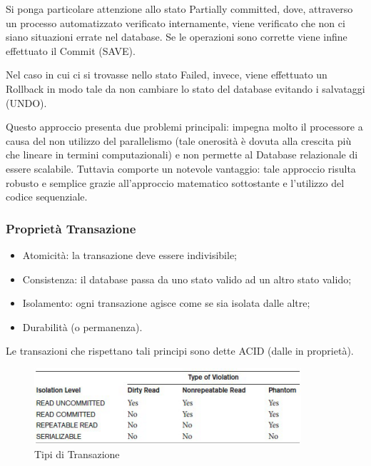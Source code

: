 Si ponga particolare attenzione allo stato Partially committed, dove, attraverso un processo automatizzato verificato internamente, viene verificato che non ci siano situazioni errate nel database. Se le operazioni sono corrette viene infine effettuato il Commit (SAVE).

Nel caso in cui ci si trovasse nello stato Failed, invece, viene effettuato un Rollback in modo tale da non cambiare lo stato del database evitando i salvataggi (UNDO).

Questo approccio presenta due problemi principali: impegna molto il processore a causa del non utilizzo del parallelismo (tale onerosità è dovuta alla crescita più che lineare in termini computazionali) e non permette al Database relazionale di essere scalabile. Tuttavia comporte un notevole vantaggio: tale approccio risulta robusto e semplice grazie all'approccio matematico sottostante e l'utilizzo del codice sequenziale.


\subsubsection{Proprietà Transazione}

\begin{itemize}

\item{Atomicità}: la transazione deve essere indivisibile;
\item{Consistenza}: il database passa da uno stato valido ad un altro stato valido;
\item{Isolamento}: ogni transazione agisce come se sia isolata dalle altre;
\item{Durabilità (o permanenza)}.

\end{itemize}

Le transazioni che rispettano tali principi sono dette ACID (dalle in proprietà).  

\begin{center}
\begin{figure}[H]
\centering
\includegraphics[scale=1]{figures/trans_types.png}
\caption{Tipi di Transazione}
\end{figure}
\end{center}

